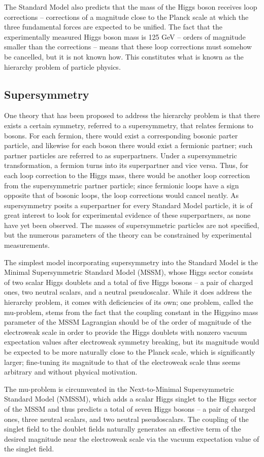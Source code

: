The Standard Model also predicts that the mass of the Higgs boson receives loop corrections -- corrections of a magnitude close to the Planck scale at which the three fundamental forces are expected to be unified. The fact that the experimentally measured Higgs boson mass is 125 GeV -- orders of magnitude smaller than the corrections -- means that these loop corrections must somehow be cancelled, but it is not known how. This constitutes what is known as the hierarchy problem of particle physics.

\subsection{Supersymmetry}

One theory that has been proposed to address the hierarchy problem is that there exists a certain symmetry, referred to a supersymmetry, that relates fermions to bosons. For each fermion, there would exist a corresponding bosonic parter particle, and likewise for each boson there would exist a fermionic partner; such partner particles are referred to as superpartners. Under a supersymmetric transformation, a fermion turns into its superpartner and vice versa. Thus, for each loop correction to the Higgs mass, there would be another loop correction from the supersymmetric partner particle; since fermionic loops have a sign opposite that of bosonic loops, the loop corrections would cancel neatly.
As supersymmetry posits a superpartner for every Standard Model particle, it is of great interest to look for experimental evidence of these superpartners, as none have yet been observed. The masses of supersymmetric particles are not specified, but the numerous parameters of the theory can be constrained by experimental measurements.

The simplest model incorporating supersymmetry into the Standard Model is the Minimal Supersymmetric Standard Model (MSSM), whose Higgs sector consists of two scalar Higgs doublets and a total of five Higgs bosons -- a pair of charged ones, two neutral scalars, and a neutral pseudoscalar. While it does address the hierarchy problem, it comes with deficiencies of its own; one problem, called the mu-problem, stems from the fact that the \mu coupling constant in the Higgsino mass parameter of the MSSM Lagrangian should be of the order of magnitude of the electroweak scale in order to provide the Higgs doublets with nonzero vacuum expectation values after electroweak symmetry breaking, but its magnitude would be expected to be more naturally close to the Planck scale, which is significantly larger; fine-tuning its magnitude to that of the electroweak scale thus seems arbitrary and without physical motivation.

The mu-problem is circumvented in the Next-to-Minimal Supersymmetric Standard Model (NMSSM), which adds a scalar Higgs singlet to the Higgs sector of the MSSM and thus predicts a total of seven Higgs bosons -- a pair of charged ones, three neutral scalars, and two neutral pseudoscalars. The coupling of the singlet field to the doublet fields naturally generates an effective \mu term of the desired magnitude near the electroweak scale via the vacuum expectation value of the singlet field.